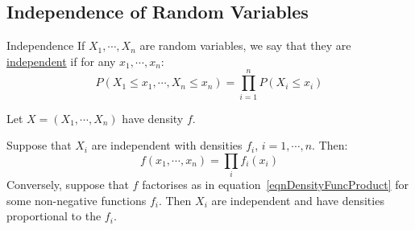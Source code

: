\documentclass[../Main.tex]{subfiles}
\begin{document}
\subsection{Independence of Random Variables}
\begin{definition}{Independence}
    If $X_1, \cdots, X_n$ are random variables, we say that they are \underline{independent} if for any $x_1, \cdots, x_n$:
    \begin{equation*}
        P(X_1 \leq x_1, \cdots, X_n \leq x_n) = \prod_{i=1}^{n} P(X_i \leq x_i)
    \end{equation*}
\end{definition}
\begin{theorem}
    Let $X = (X_1, \cdots, X_n)$ have density $f$.\par
    Suppose that $X_i$ are independent with densities $f_i$, $i = 1, \cdots, n$. Then:
    \begin{equation}
        f(x_1, \cdots, x_n) = \prod_i f_i(x_i)
        \label{eqnDensityFuncProduct}
    \end{equation}
    Conversely, suppose that $f$ factorises as in equation~\ref{eqnDensityFuncProduct} for some non-negative functions $f_i$. Then $X_i$ are independent and have densities proportional to the $f_i$.
    \label{thmDensityFactorising}
\end{theorem}
\end{document}

